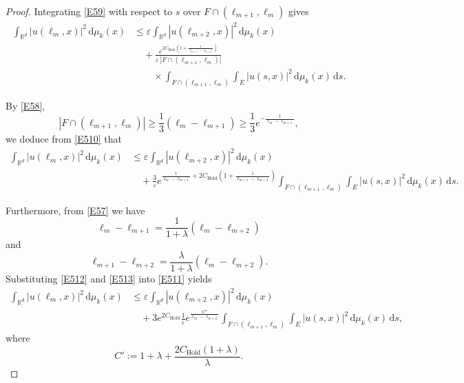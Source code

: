 \documentclass[12pt]{article}
\begin{document}
\begin{proof}
Integrating \eqref{E59} with respect to $s$ over $F\cap(\ell_{m+1},\ell_m)$ gives
\begin{equation}\label{E510}
\begin{aligned}
\int_{\mathbb{R}^d}|u(\ell_m,x)|^2\,\mathrm{d}\mu_k(x)
&\le \varepsilon\int_{\mathbb{R}^d}|u(\ell_{m+2},x)|^2\,\mathrm{d}\mu_k(x)\\
&\quad+\frac{e^{2C_{\mathrm{Hold}}\left(1+\frac1{\ell_{m+1}-\ell_{m+2}}\right)}}
 {\varepsilon\,|F\cap(\ell_{m+1},\ell_m)|}\\
&\qquad\times\int_{F\cap(\ell_{m+1},\ell_m)}\int_E
 |u(s,x)|^2\,\mathrm{d}\mu_k(x)\,\mathrm{d}s.
\end{aligned}
\end{equation}

By \eqref{E58},
\[
|F\cap(\ell_{m+1},\ell_m)| \ge \frac13(\ell_m-\ell_{m+1}) \ge \frac13 e^{-\frac{1}{\ell_m-\ell_{m+1}}},
\]
we deduce from \eqref{E510} that
\begin{equation}\label{E511}
\begin{aligned}
\int_{\mathbb{R}^d} |u(\ell_m,x)|^2 \, \mathrm{d}\mu_k(x)
&\le \varepsilon \int_{\mathbb{R}^d} |u(\ell_{m+2},x)|^2 \, \mathrm{d}\mu_k(x) \\
&\quad + \frac{3}{\varepsilon}e^{\frac{1}{\ell_m-\ell_{m+1}}+2C_{\mathrm{Hold}}\left(1+\frac{1}{\ell_{m+1}-\ell_{m+2}}\right)}
\int_{F\cap(\ell_{m+1},\ell_m)}\int_{E} |u(s,x)|^2 \, \mathrm{d}\mu_k(x)\, \mathrm{d}s.
\end{aligned}
\end{equation}


Furthermore, from \eqref{E57} we have
\begin{equation}\label{E512}
\ell_m - \ell_{m+1} = \frac{1}{1+\lambda}(\ell_m - \ell_{m+2})
\end{equation}
and
\begin{equation}\label{E513}
\ell_{m+1} - \ell_{m+2} = \frac{\lambda}{1+\lambda}(\ell_m - \ell_{m+2}).
\end{equation}
Substituting \eqref{E512} and \eqref{E513} into \eqref{E511} yields
\begin{equation} \label{E514}
\begin{aligned}
\int_{\mathbb{R}^d} |u(\ell_m,x)|^2 \, \mathrm{d}\mu_k(x)
&\le \varepsilon \int_{\mathbb{R}^d} |u(\ell_{m+2},x)|^2 \, \mathrm{d}\mu_k(x) \\
&\quad + 3e^{2C_{\mathrm{Hold}}} \frac{1}{\varepsilon} e^{\frac{C'}{\ell_m-\ell_{m+2}}}
\int_{F\cap(\ell_{m+1},\ell_m)} \int_{E} |u(s,x)|^2 \, \mathrm{d}\mu_k(x)\, \mathrm{d}s,
\end{aligned}
\end{equation}
where
\begin{equation}\label{E515}
C' := 1+\lambda + \frac{2C_{\mathrm{Hold}}(1+\lambda)}{\lambda}.
\end{equation}


\end{proof}
\end{document}
